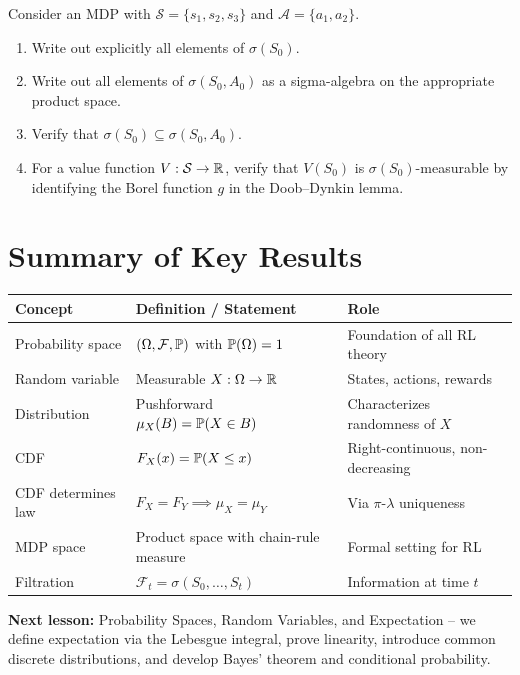 \documentclass[11pt,a4paper]{article}
\begin{document}
\begin{exercise}
\label{ex:rl_filtration}
Consider an MDP with $\mathcal{S} = \{s_1, s_2, s_3\}$ and
$\mathcal{A} = \{a_1, a_2\}$.
\begin{enumerate}[nosep,label=(\alph*)]
  \item Write out explicitly all elements of $\sigma(S_0)$.
  \item Write out all elements of $\sigma(S_0, A_0)$ as a sigma-algebra on
    the appropriate product space.
  \item Verify that $\sigma(S_0) \subseteq \sigma(S_0, A_0)$.
  \item For a value function $V: \mathcal{S} \to \mathbb{R}$, verify that
    $V(S_0)$ is $\sigma(S_0)$-measurable by identifying the Borel
    function $g$ in the Doob--Dynkin lemma.
\end{enumerate}
\end{exercise}


\section{Summary of Key Results}
\label{sec:summary}

\begin{center}
\renewcommand{\arraystretch}{1.4}
\begin{tabular}{p{4cm} p{5.5cm} p{4.5cm}}
\toprule
\textbf{Concept} & \textbf{Definition / Statement} & \textbf{Role} \\
\midrule
Probability space & $(\Omega, \mathcal{F}, \mathbb{P})$ with
  $\mathbb{P}(\Omega) = 1$ & Foundation of all RL theory \\
Random variable & Measurable $X: \Omega \to \mathbb{R}$ &
  States, actions, rewards \\
Distribution & Pushforward $\mu_X(B) = \mathbb{P}(X \in B)$ &
  Characterizes randomness of $X$ \\
CDF & $F_X(x) = \mathbb{P}(X \leq x)$ &
  Right-continuous, non-decreasing \\
CDF determines law & $F_X = F_Y \implies \mu_X = \mu_Y$ &
  Via $\pi$-$\lambda$ uniqueness \\
MDP space & Product space with chain-rule measure &
  Formal setting for RL \\
Filtration & $\mathcal{F}_t = \sigma(S_0, \ldots, S_t)$ &
  Information at time $t$ \\
\bottomrule
\end{tabular}
\end{center}

\medskip
\noindent\textbf{Next lesson:} Probability Spaces, Random Variables, and
Expectation -- we define expectation via the Lebesgue integral, prove
linearity, introduce common discrete distributions, and develop Bayes'
theorem and conditional probability.


\end{document}
